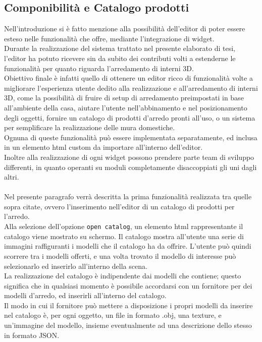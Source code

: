 \subsection{Componibilità e Catalogo prodotti}
\label{sec:chapter_creazione_scena_funzionalita_editor_catalogo}
Nell’introduzione si è fatto menzione alla possibilità dell’editor di poter essere esteso nelle funzionalità che offre, mediante l’integrazione di widget.
\\
Durante la realizzazione del sistema trattato nel presente elaborato di tesi, l’editor ha potuto ricevere sin da subito dei contributi volti a estenderne le funzionalità per quanto riguarda l’arredamento di interni 3D.
\\
Obiettivo finale è infatti quello di ottenere un editor ricco di funzionalità volte a migliorare l’esperienza utente dedito alla realizzazione e all’arredamento di interni 3D, come la possibilità di fruire di setup di arredamento preimpostati in base all’ambiente della casa, aiutare l’utente nell’abbinamento e nel posizionamento degli oggetti, fornire un catalogo di prodotti d’arredo pronti all’uso, o un sistema per semplificare la realizzazione delle mura domestiche.
\\
Ognuna di queste funzionalità può essere implementata separatamente, ed inclusa in un elemento html custom da importare all’interno dell’editor.
\\ 
Inoltre alla realizzazione di ogni widget possono prendere parte team di sviluppo differenti, in quanto operanti su moduli completamente disaccoppiati gli uni dagli altri.
\\
\\
Nel presente paragrafo verrà descritta la prima funzionalità realizzata tra quelle sopra citate, ovvero l’inserimento nell’editor di un catalogo di prodotti per l’arredo. 
\\
Alla selezione dell’opzione \texttt{open catalog}, un elemento html rappresentante il catalogo viene mostrato su schermo. Il catalogo mostra all’utente una serie di immagini raffiguranti i modelli che il catalogo ha da offrire. L’utente può quindi scorrere tra i modelli offerti, e una volta trovato il modello di interesse può selezionarlo ed inserirlo all’interno della scena.
\\
La realizzazione del catalogo è indipendente dai modelli che contiene; questo significa che in qualsiasi momento è possibile accordarsi con un fornitore per dei modelli d’arredo, ed inserirli all’interno del catalogo.
\\ 
Il modo in cui il fornitore può mettere a disposizione i propri modelli da inserire nel catalogo è, per ogni oggetto, un file in formato .obj, una texture, e un’immagine del modello, insieme eventualmente ad una descrizione dello stesso in formato JSON.
